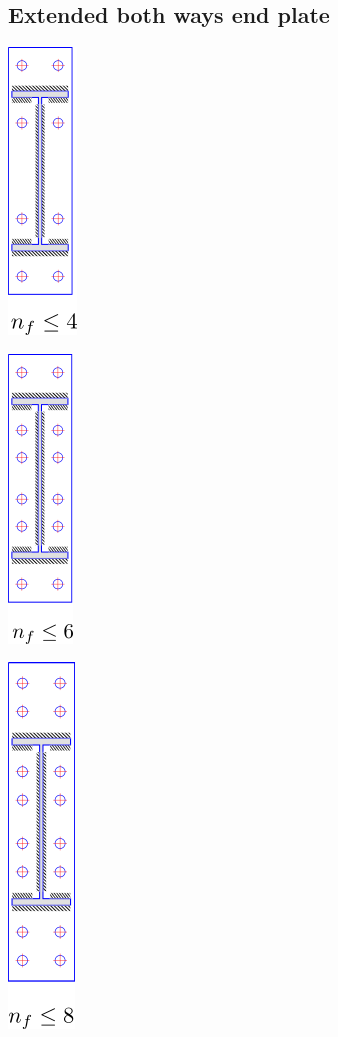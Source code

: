 \documentclass[11.5pt,a4paper,oneside]{report}
\begin{document}
\begin{Form}
\subsection{Extended both ways end plate}
	\begin{multicols}{3}
		\begin{center}
			\includegraphics{bolt_layout7.png}
		\end{center}
		\begin{center}
			\includegraphics{bolt_layout8.png}
		\end{center}
		\begin{center}
			\includegraphics{bolt_layout9.png}
		\end{center}
	\end{multicols}

\end{Form}
\end{document}

